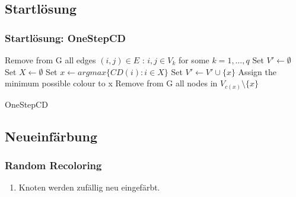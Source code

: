 \documentclass{beamer}
\begin{document}
\subsection{Startlösung}
\begin{frame}
\frametitle{Startlösung: OneStepCD}
  \begin{algorithm}[H]
  \scriptsize
  Remove from G all edges $(i,j) \in E$ : $i,j \in V_k$ for some $k=1,\ldots,q$\; 
  Set $V' \gets \emptyset $\;
   {
    Set $X \gets \emptyset $\;
    Set $x \gets argmax\{CD(i) : i \in X \}$\;
    Set $V' \gets V' \cup \{x\}$\;
    Assign the minimum possible colour to x\;
    Remove from G all nodes in $V_{c(x)} \setminus \{x\} $\;
  }
  \;
  \caption{{\sc OneStepCD}}
  \label{algo:osdc}
  \end{algorithm}
\end{frame}

\FloatBarrier
\subsection{Neueinfärbung}
\begin{frame}
\frametitle{Random Recoloring}
\begin{enumerate}
\item Knoten werden zufällig neu eingefärbt.
\end{enumerate}

\end{frame}
\end{document}
